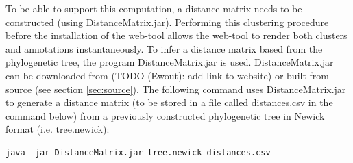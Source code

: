\documentclass[a4paper, 11pt]{article} %
\begin{document}
To be able to support this computation, a distance matrix needs to be constructed (using DistanceMatrix.jar).
Performing this clustering procedure before the installation of the web-tool allows the web-tool to render both clusters and annotations instantaneously.
To infer a distance matrix based from the phylogenetic tree, the program DistanceMatrix.jar is used. DistanceMatrix.jar can be downloaded from (TODO (Ewout): add link to website) or built from source (see section \ref{sec:source}). 
The following command uses DistanceMatrix.jar to generate a distance matrix (to be stored in a file called distances.csv in the command below) from a previously constructed phylogenetic tree in Newick format (i.e. tree.newick): 
\begin{verbatim}
java -jar DistanceMatrix.jar tree.newick distances.csv
\end{verbatim}
\end{document}
